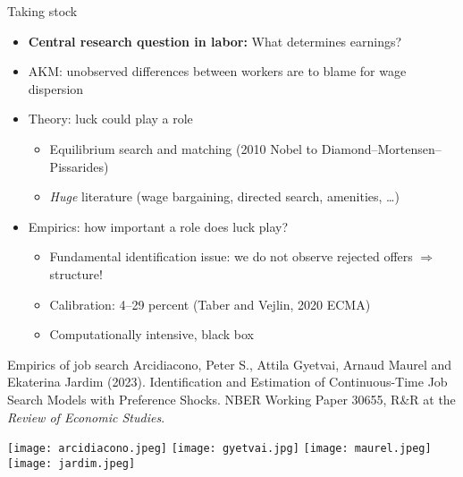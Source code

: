 \documentclass[aspectratio=169,compress,t,xcolor=table]{beamer}
\begin{document}
\begin{frame}{Taking stock}
  \begin{itemize}
    \vfill\item {\color{MyStructure}\textbf{Central research question in labor:}} What determines earnings?
    \vfill\item AKM: unobserved differences between workers are to blame for wage dispersion
    \vfill\item Theory: luck could play a role
    \begin{itemize}
      \item Equilibrium search and matching (2010 Nobel to Diamond--Mortensen--Pissarides)
      \item \textit{Huge} literature (wage bargaining, directed search, amenities, \ldots)
    \end{itemize}
    \vfill\item Empirics: how important a role does luck play?
    \begin{itemize}
      \item Fundamental identification issue: we do not observe rejected offers \(\Rightarrow\) structure!
      \item Calibration: 4--29 percent (Taber and Vejlin, 2020 ECMA)
      \item Computationally intensive, black box
    \end{itemize}
  \end{itemize}
\end{frame}

\begin{frame}{Empirics of job search}
Arcidiacono, Peter S., Attila Gyetvai, Arnaud Maurel and Ekaterina Jardim (2023). Identification and Estimation of Continuous-Time Job Search Models with Preference Shocks. NBER Working Paper 30655, R\&R at the \textit{Review of Economic Studies}.
  \begin{center}
    \texttt{[image: arcidiacono.jpeg]} \hspace*{1em}
    \texttt{[image: gyetvai.jpg]} \hspace*{1em}
    \texttt{[image: maurel.jpeg]} \hspace*{1em}
    \texttt{[image: jardim.jpeg]}
  \end{center}
\end{frame}
\addtocounter{framenumber}{-1}
\end{document}
